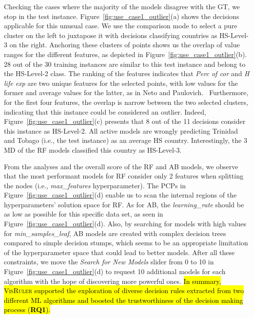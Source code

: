 Checking the cases where the majority of the models disagree with the GT, we stop in the  test instance. Figure~\ref{fig:use_case1_outlier}(a) shows the decisions applicable for this unusual case. We use the comparison mode to select a pure cluster on the left to juxtapose it with decisions classifying countries as HS-Level-3 on the right. Anchoring these clusters of points shows us the overlap of value ranges for the different features, as depicted in Figure~\ref{fig:use_case1_outlier}(b). 28 out of the 30 training instances are similar to this test instance and belong to the HS-Level-2 class. The ranking of the features indicates that \emph{Perc of cor} and \emph{H life exp} are two unique features for the selected points, with low values for the former and average values for the latter, as in Neto and Paulovich.~\cite{Neto2021Multivariate} Furthermore, for the first four features, the overlap is narrow between the two selected clusters, indicating that this instance could be considered an outlier. Indeed, Figure~\ref{fig:use_case1_outlier}(c) presents that 8 out of the 11 decisions consider this instance as HS-Level-2. All active models are wrongly predicting Trinidad and Tobago (i.e., the  test instance) as an average HS country. Interestingly, the 3 MD of the RF models classified this country as HS-Level-3.

From the analyses and the overall score of the RF and AB models, we observe that the most performant models for RF consider only 2 features when splitting the nodes (i.e., \emph{max\_features} hyperparameter). The PCPs in Figure~\ref{fig:use_case1_outlier}(d) enable us to scan the internal regions of the hyperparameters' solution space for RF. As for AB, the \emph{learning\_rate} should be as low as possible for this specific data set, as seen in Figure~\ref{fig:use_case1_outlier}(d). Also, by searching for models with high values for \emph{min\_samples\_leaf}, AB models are created with complex decision trees compared to simple decision stumps, which seems to be an appropriate limitation of the hyperparameter space that could lead to better models. After all these constraints, we move the \emph{Search for New Models} slider from 0 to 10 in Figure~\ref{fig:use_case1_outlier}(d) to request 10 additional models for each algorithm with the hope of discovering more powerful ones. \hl{In summary, \textsc{VisRuler} supported the exploration of diverse decision rules extracted from two different ML algorithms and boosted the trustworthiness of the decision making process (\textbf{RQ1}).}